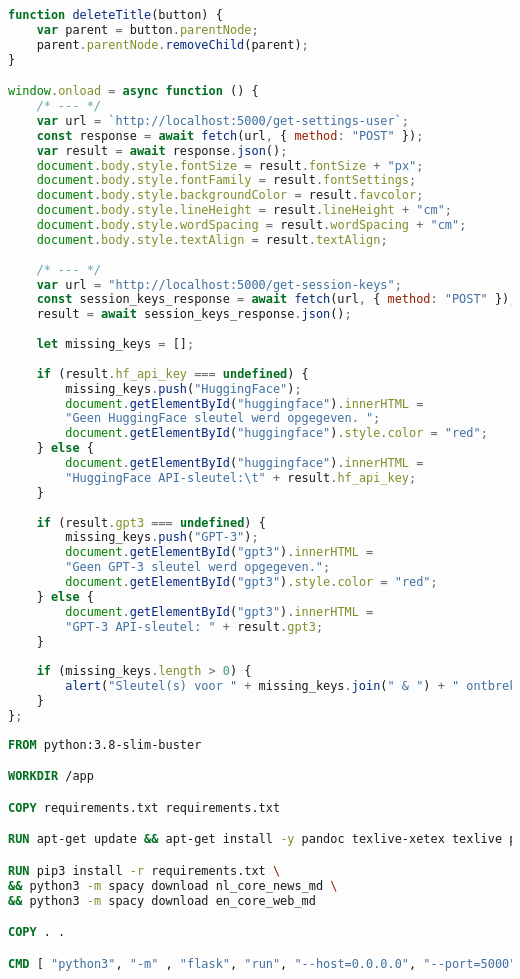 \begin{lstlisting}[language=JavaScript, caption={De toegepaste scripts voor enkel het lerarencomponent.}, label={code:js-teachers}]
function deleteTitle(button) {
	var parent = button.parentNode;
	parent.parentNode.removeChild(parent);
}

window.onload = async function () {
	/* --- */
	var url = `http://localhost:5000/get-settings-user`;
	const response = await fetch(url, { method: "POST" });
	var result = await response.json();
	document.body.style.fontSize = result.fontSize + "px";
	document.body.style.fontFamily = result.fontSettings;
	document.body.style.backgroundColor = result.favcolor;
	document.body.style.lineHeight = result.lineHeight + "cm";
	document.body.style.wordSpacing = result.wordSpacing + "cm";
	document.body.style.textAlign = result.textAlign;
	
	/* --- */
	var url = "http://localhost:5000/get-session-keys";
	const session_keys_response = await fetch(url, { method: "POST" });
	result = await session_keys_response.json();
	
	let missing_keys = [];
	
	if (result.hf_api_key === undefined) {
		missing_keys.push("HuggingFace");
		document.getElementById("huggingface").innerHTML =
		"Geen HuggingFace sleutel werd opgegeven. ";
		document.getElementById("huggingface").style.color = "red";
	} else {
		document.getElementById("huggingface").innerHTML =
		"HuggingFace API-sleutel:\t" + result.hf_api_key;
	}
	
	if (result.gpt3 === undefined) {
		missing_keys.push("GPT-3");
		document.getElementById("gpt3").innerHTML =
		"Geen GPT-3 sleutel werd opgegeven.";
		document.getElementById("gpt3").style.color = "red";
	} else {
		document.getElementById("gpt3").innerHTML =
		"GPT-3 API-sleutel: " + result.gpt3;
	}
	
	if (missing_keys.length > 0) {
		alert("Sleutel(s) voor " + missing_keys.join(" & ") + " ontbreken.");
	}
};

\end{lstlisting}


\begin{lstlisting}[language=Dockerfile, caption={Dockerfile voor het prototype.}, label={code:dockerfile}]
FROM python:3.8-slim-buster

WORKDIR /app

COPY requirements.txt requirements.txt

RUN apt-get update && apt-get install -y pandoc texlive-xetex texlive poppler-utils

RUN pip3 install -r requirements.txt \
&& python3 -m spacy download nl_core_news_md \
&& python3 -m spacy download en_core_web_md

COPY . .

CMD [ "python3", "-m" , "flask", "run", "--host=0.0.0.0", "--port=5000"]
\end{lstlisting}


